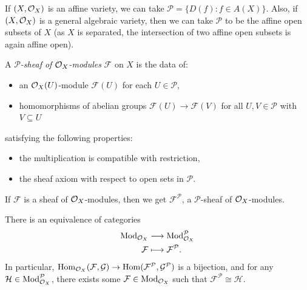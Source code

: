 \begin{example}
  If $(X, \mathcal{O}_X)$ is an affine
  variety, we can take $\mathcal{P} = \{D(f) : f \in A(X)\}$.
  Also, if $(X, \mathcal{O}_X)$ is a
  general algebraic variety, then
  we can take $\mathcal{P}$
  to be the affine open subsets of $X$ 
  (as $X$ is separated, the intersection
  of two affine open subsets is
  again affine open).
\end{example}

\begin{definition}
  A \emph{$\mathcal{P}$-sheaf of $\mathcal{O}_X$-modules}
  $\mathcal{F}$
  on $X$ is the data of:
  \begin{itemize}
    \item an $\mathcal{O}_X(U)$-module
      $\mathcal{F}(U)$ for
      each $U \in \mathcal{P}$,
    \item homomorphisms of abelian
      groups $\mathcal{F}(U) \to \mathcal{F}(V)$
      for all $U, V \in \mathcal{P}$
      with $V \subseteq U$
  \end{itemize}
  satisfying the following properties:
  \begin{itemize}
    \item the multiplication is
      compatible with restriction,
    \item the sheaf axiom with respect
      to open sets in $\mathcal{P}$.
  \end{itemize}
\end{definition}

\begin{example}
  If $\mathcal{F}$ is a sheaf of
  $\mathcal{O}_X$-modules, then we get
  $\mathcal{F}^{\mathcal{P}}$,
  a $\mathcal{P}$-sheaf of
  $\mathcal{O}_X$-modules.
\end{example}

\begin{theorem}\label{thm:P-sheaf-equivalence}
  There is an equivalence of categories
  \begin{align*}
    \mathrm{Mod}_{\mathcal{O}_X}
    &\longrightarrow
    \mathrm{Mod}_{\mathcal{O}_X}^{\mathcal{P}} \\
    \mathcal{F}
    &\longmapsto
    \mathcal{F}^{\mathcal{P}}.
  \end{align*}
  In particular,
  $\operatorname{Hom}_{\mathcal{O}_X}(\mathcal{F}, \mathcal{G}) \to \operatorname{Hom}(\mathcal{F}^{\mathcal{P}}, \mathcal{G}^{\mathcal{P}})$
  is a bijection, and for any
  $\mathcal{H} \in \mathrm{Mod}_{\mathcal{O}_X}^{\mathcal{P}}$,
  there exists some $\mathcal{F} \in \mathrm{Mod}_{\mathcal{O}_X}$
  such that $\mathcal{F}^{\mathcal{P}} \cong \mathcal{H}$.
\end{theorem}

